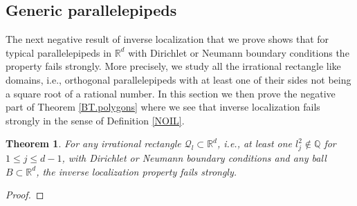 \documentclass{amsart}
\newtheorem{theorem}{Theorem}[section]
\theoremstyle{definition}
\theoremstyle{remark}
\def\RR{\mathbb{R}}
\renewcommand\leq\leqslant
\numberwithin{equation}{section}
\theoremstyle{definition}
\theoremstyle{remark}
\def\RR{\mathbb{R}}
\DeclareMathOperator\MW{MW}
\begin{document}
\subsection{Generic parallelepipeds}\label{Nopara}
The next negative result of inverse localization that we prove shows that for typical parallelepipeds in $\RR^d$ with Dirichlet or Neumann boundary conditions the property fails strongly. More precisely, we study all the irrational rectangle like domains, i.e., orthogonal parallelepipeds with at least one of their sides not being a square root of a rational number. In this section we then prove the negative part of Theorem \ref{BT.polygons} where we see that inverse localization fails strongly in the sense of Definition \ref{NOIL}.
\begin{theorem}
For any irrational rectangle $\mathcal{Q}_l\subset\RR^d$, i.e., at least one $l_j^2\notin\mathbb{Q}$ for $1\leq j\leq d-1$, with Dirichlet or Neumann boundary conditions and any ball $B\subset\RR^d$, the inverse localization property fails strongly. 
\end{theorem}\begin{proof}
	

\end{proof}
\end{document}
